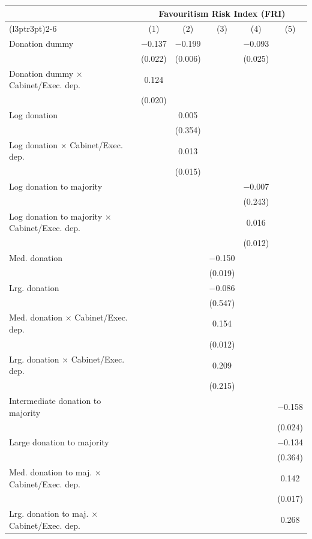 
\begin{tabular}[t]{lccccc}
\toprule
\multicolumn{1}{c}{ } & \multicolumn{5}{c}{Favouritism Risk Index (FRI)} \\
\cmidrule(l{3pt}r{3pt}){2-6}
  & (1) & (2) & (3) & (4) & (5)\\
\midrule
Donation dummy & \num{-0.137} & \num{-0.199} &  & \num{-0.093} & \\
 & (\num{0.022}) & (\num{0.006}) &  & (\num{0.025}) & \\
Donation dummy $\times$ Cabinet/Exec. dep. & \num{0.124} &  &  &  & \\
 & (\num{0.020}) &  &  &  & \\
Log donation &  & \num{0.005} &  &  & \\
 &  & (\num{0.354}) &  &  & \\
Log donation $\times$ Cabinet/Exec. dep. &  & \num{0.013} &  &  & \\
 &  & (\num{0.015}) &  &  & \\
Log donation to majority &  &  &  & \num{-0.007} & \\
 &  &  &  & (\num{0.243}) & \\
Log donation to majority $\times$ Cabinet/Exec. dep. &  &  &  & \num{0.016} & \\
 &  &  &  & (\num{0.012}) & \\
Med. donation &  &  & \num{-0.150} &  & \\
 &  &  & (\num{0.019}) &  & \\
Lrg. donation &  &  & \num{-0.086} &  & \\
 &  &  & (\num{0.547}) &  & \\
Med. donation $\times$ Cabinet/Exec. dep. &  &  & \num{0.154} &  & \\
 &  &  & (\num{0.012}) &  & \\
Lrg. donation $\times$ Cabinet/Exec. dep. &  &  & \num{0.209} &  & \\
 &  &  & (\num{0.215}) &  & \\
Intermediate donation to majority &  &  &  &  & \num{-0.158}\\
 &  &  &  &  & (\num{0.024})\\
Large donation to majority &  &  &  &  & \num{-0.134}\\
 &  &  &  &  & (\num{0.364})\\
Med. donation to maj. $\times$ Cabinet/Exec. dep. &  &  &  &  & \num{0.142}\\
 &  &  &  &  & (\num{0.017})\\
Lrg. donation to maj. $\times$ Cabinet/Exec. dep. &  &  &  &  & \num{0.268}\\

\end{tabular}

